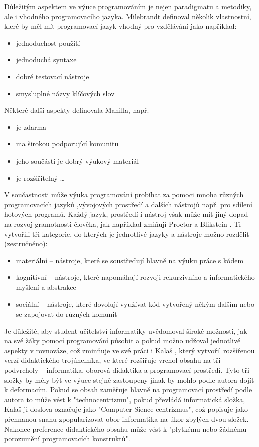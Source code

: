 \documentclass[FP,DP]{tulthesis}
\begin{document}
{{{{{{{Důležitým aspektem ve výuce programováním je nejen paradigmatu a metodiky, ale i vhodného programovacího jazyka. Milebrandt definoval několik vlastnostní, kleré by měl mít programovací jazyk vhodný pro vzdělávání jako například:
\vspace{2mm}\begin{itemize}[nosep]
  	\item jednoduchost použití
	\item jednoduchá syntaxe
	\item dobré testovací nástroje
	\item smysluplné názvy klíčových slov
\end{itemize}
\vspace{2mm}Některé další aspekty definovala Manilla, např.
\vspace{2mm}\begin{itemize}[nosep]
  	\item je zdarma
	\item ma širokou podporující komunitu
	\item jeho součástí je dobrý výukový materiál
	\item je rozšiřitelný \ldots
\end{itemize}
V součastnosti může výuka programování probíhat za pomoci mnoha různých programovacích jazyků ,vývojových prostředí a dalších nástrojů např. pro sdílení hotových programů. Každý jazyk, prostředí i nástroj však může mít jiný dopad na rozvoj gramotnosti člověka, jak například zmiňují Proctor a Blikstein \citep{proctor2016}. Ti vytvořili tři kategorie, do kterých je jednotlivé jazyky a nástroje možno rozdělit (zestručněno):
\vspace{2mm}\begin{itemize}[nosep]
  	\item materiální -- nástroje, které se soustřeďují hlavně na výuku práce s kódem
	\item kognitivní -- nástroje, které napomáhají rozvoji rekurzivního a informatického myšlení a abstrakce
	\item sociální -- nástroje, které dovolují využívat kód vytvořený někým dalším nebo se zapojovat do různých komunit
\end{itemize}
Je důležité, aby student učitelství informatiky uvědomoval široké možnosti, jak na své žáky pomocí programování působit a pokud možno udžoval jednotlivé aspekty v rovnováze, což zminňuje ve své práci i Kalaš \citep{kalas2016}, který vytvořil rozšířenou verzí didaktického trojúhelníka, ve které rozšiřuje vrchol obsahu na tři podvrcholy -- informatika, oborová didaktika a programovací prostředí. Tyto tři složky by měly být ve výuce stejně zastoupeny jinak by mohlo podle autora dojít k deformacím. Pokud se obsah zaměřuje hlavně na programovací prostředí podle autora to může vést k "technocentrizmu", pokud převládá informatická složka, Kalaš ji doslova označuje jako "Computer Sience centrizmus", což popisuje jako přehnanou snahu zpopularizovat obor informatika na úkor zbylých dvou složek. Nakonec preference didaktického obsahu může vést k "plytkému nebo žádnému porozumění programovacích konstruktů".
}}}}}}}
\end{document}
